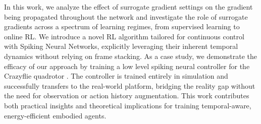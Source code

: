 In this work, we analyze the effect of surrogate gradient settings on the gradient being propagated throughout the network and investigate the role of surrogate gradients across a spectrum of learning regimes, from supervised learning to online RL. We introduce a novel RL algorithm tailored for continuous control with Spiking Neural Networks, explicitly leveraging their inherent temporal dynamics without relying on frame stacking. As a case study, we demonstrate the efficacy of our approach by training a low level spiking neural controller for the Crazyflie quadrotor \cite{crazyflie}. The controller is trained entirely in simulation and successfully transfers to the real-world platform, bridging the reality gap without the need for observation or action history augmentation. This work contributes both practical insights and theoretical implications for training temporal-aware, energy-efficient embodied agents. 




